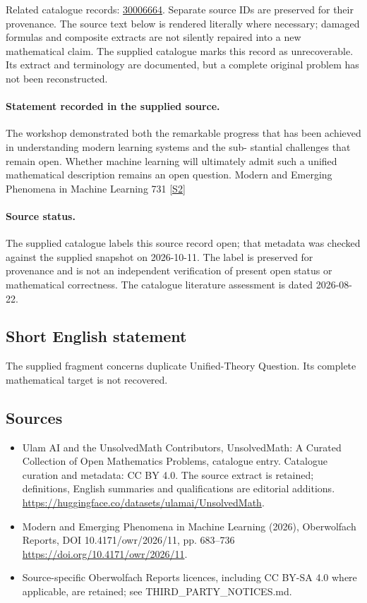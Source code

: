 \documentclass[11pt]{article}
\begin{document}
Related catalogue records: \href{https://mehmetmars7.github.io/Erdosproblems-llm-hunter/problem.html?type=open_problems&id=30006664}{30006664}. Separate source IDs are preserved for their provenance.
The source text below is rendered literally where necessary; damaged formulas and composite extracts are not silently repaired into a new mathematical claim.
The supplied catalogue marks this record as unrecoverable. Its extract and terminology are documented, but a complete original problem has not been reconstructed.
\paragraph{Statement recorded in the supplied source.}
The workshop demonstrated both the remarkable progress that has been achieved in understanding modern learning systems and the sub- stantial challenges that remain open. Whether machine learning will ultimately admit such a uniﬁed mathematical description remains an open question. Modern and Emerging Phenomena in Machine Learning 731 \href{https://doi.org/10.4171/owr/2026/11}{[S2]}
\paragraph{Source status.}
The supplied catalogue labels this source record open; that metadata was checked against the supplied snapshot on 2026-10-11. The label is preserved for provenance and is not an independent verification of present open status or mathematical correctness. The catalogue literature assessment is dated 2026-08-22.
\subsection{Short English statement}
The supplied fragment concerns duplicate Unified-Theory Question. Its complete mathematical target is not recovered.
\subsection{Sources}
\begin{itemize}
\item[S1] Ulam AI and the UnsolvedMath Contributors, UnsolvedMath: A Curated Collection of Open Mathematics Problems, catalogue entry. Catalogue curation and metadata: CC BY 4.0. The source extract is retained; definitions, English summaries and qualifications are editorial additions.
\url{https://huggingface.co/datasets/ulamai/UnsolvedMath}.
\item[S2] Modern and Emerging Phenomena in Machine Learning (2026), Oberwolfach Reports, DOI 10.4171/owr/2026/11, pp. 683--736
\url{https://doi.org/10.4171/owr/2026/11}.
\item Source-specific Oberwolfach Reports licences, including CC BY-SA 4.0 where applicable, are retained; see THIRD\_PARTY\_NOTICES.md.
\end{itemize}
\end{document}
